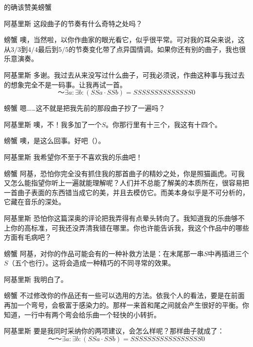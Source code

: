 \begin{dialog}{的确该赞美螃蟹}
\begin{dialogue}
\item[阿基里斯]这段曲子的节奏有什么奇特之处吗？

\item[螃蟹]噢，当然啦，以你作曲家的眼光看它，似乎很平常。可对我的耳朵来说，这从$3/3$到$4/4$最后到$5/5$的节奏变化带了点异国情调。如果你还有别的曲子，我也很乐意演奏。

\item[阿基里斯]多谢。我过去从来没写过什么曲子，可我必须说，作曲这种事与我过去的想象完全不是一码事。让我再试一首。
\[
～\exists a:\exists b:(SSa\cdot SSb)=SSSSSSSSSSSSSS0
\]

\item[螃蟹]嗯……这不就是把我先前的那段曲子抄了一遍吗？

\item[阿基里斯]噢，不！我多加了一个$S$。你那行里有十三个，我这有十四个。

\item[螃蟹]噢，是这么回事。好吧（）。

\item[阿基里斯]我希望你不至于不喜欢我的乐曲吧！

\item[螃蟹]阿基，恐怕你完全没有抓住我的那首曲子的精妙之处，你是照猫画虎。可我又怎么能指望你听上一遍就能理解呢？人们并不总能了解美的本质所在，很容易把一首曲子表面的东西错当成它的美，并且去模仿它。而美本身似乎是不可分析的，它藏在音乐的深处。

\item[阿基里斯]恐怕你这篇深奥的评论把我弄得有点晕头转向了。我知道我的乐曲够不上你的高标准，可我还没弄清我错在哪里。你也许能告诉我，我这个作品中的哪些方面有毛病吧？

\item[螃蟹]阿基，对你的作品可能会有的一种补救方法是：在末尾那一串$S$中再插进三个$S$（五个也行）。这将会造成一种精巧的不同寻常的效果。

\item[阿基里斯]我明白了。

\item[螃蟹]不过修改你的作品还有一些可以选用的方法。依我个人的看法，要是在前面再加一个弯号，会极富于感染力的。那样一来首和尾之间就会产生很好的平衡。你知道，一行中有两个弯会给乐曲一个轻快的小转折。

\item[阿基里斯]要是我同时采纳你的两项建议，会怎么样呢？那样曲子就成了：
\[
～～\exists a:\exists b:(SSa\cdot SSb)=SSSSSSSSSSSSSSSSS0
\]


\end{dialogue}
\end{dialog}
